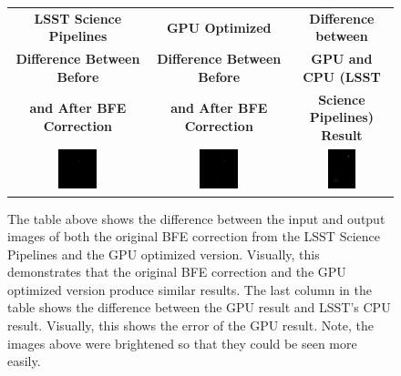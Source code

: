 \documentclass[DM,authoryear,toc]{lsstdoc}
\begin{document}
\begin{figure}[h]
\centering
  \begin{tabular}[t]{ccc}
    \textbf{LSST Science Pipelines} & \textbf{GPU Optimized} & \textbf{Difference between}\\
    \textbf{Difference Between Before} & \textbf{Difference Between Before}& \textbf{GPU and CPU (LSST}\\
    \textbf{and After BFE Correction}  & \textbf{and After BFE Correction} & \textbf{Science Pipelines) Result}\\
    \includegraphics[trim=4cm 3.7cm 8cm 4.5cm,clip=true,width=0.3\textwidth]{./figs/fig16/LSST_input_output_difference_snippet.png} &
    \includegraphics[trim=6.5cm 3.8cm 5.5cm 4.1cm,clip=true,width=0.3\textwidth]{./figs/fig16/GPU_input_output_difference_snippet.png} &
    \includegraphics[width=0.3\textwidth]{./figs/fig16/LSST_GPU_error_snippet.png} \\
  \end{tabular}
\caption{The table above shows the difference between the input and output images of both the original BFE correction from the LSST Science Pipelines and the GPU optimized version. Visually, this demonstrates that the original BFE correction and the GPU optimized version produce similar results. The last column in the table shows the difference between the GPU result and LSST's CPU result. Visually, this shows the error of the GPU result. Note, the images above were brightened so that they could be seen more easily.}
\label{fig:bfediff}
\end{figure}
\end{document}
